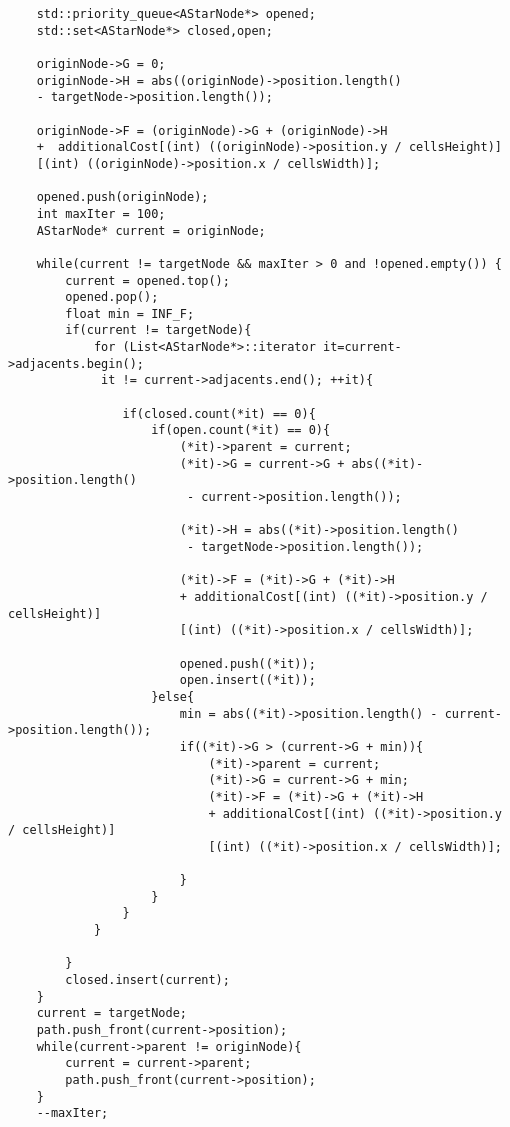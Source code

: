 \begin{lstlisting}
    std::priority_queue<AStarNode*> opened;
    std::set<AStarNode*> closed,open;
   
    originNode->G = 0;
    originNode->H = abs((originNode)->position.length() 
    - targetNode->position.length());

    originNode->F = (originNode)->G + (originNode)->H 
    +  additionalCost[(int) ((originNode)->position.y / cellsHeight)]
    [(int) ((originNode)->position.x / cellsWidth)];

    opened.push(originNode);
    int maxIter = 100;
    AStarNode* current = originNode;

    while(current != targetNode && maxIter > 0 and !opened.empty()) { 
        current = opened.top();
        opened.pop();
        float min = INF_F;
        if(current != targetNode){
            for (List<AStarNode*>::iterator it=current->adjacents.begin();
             it != current->adjacents.end(); ++it){

                if(closed.count(*it) == 0){
                    if(open.count(*it) == 0){
                        (*it)->parent = current;
                        (*it)->G = current->G + abs((*it)->position.length()
                         - current->position.length());

                        (*it)->H = abs((*it)->position.length()
                         - targetNode->position.length());

                        (*it)->F = (*it)->G + (*it)->H 
                        + additionalCost[(int) ((*it)->position.y / cellsHeight)]
                        [(int) ((*it)->position.x / cellsWidth)];

                        opened.push((*it));
                        open.insert((*it));
                    }else{
                        min = abs((*it)->position.length() - current->position.length());
                        if((*it)->G > (current->G + min)){
                            (*it)->parent = current;
                            (*it)->G = current->G + min;
                            (*it)->F = (*it)->G + (*it)->H 
                            + additionalCost[(int) ((*it)->position.y / cellsHeight)]
                            [(int) ((*it)->position.x / cellsWidth)];

                        }
                    }
                }
            }

        }
        closed.insert(current);   
    }
    current = targetNode;    
    path.push_front(current->position);
    while(current->parent != originNode){
        current = current->parent;
        path.push_front(current->position);
    }
    --maxIter;
\end{lstlisting}